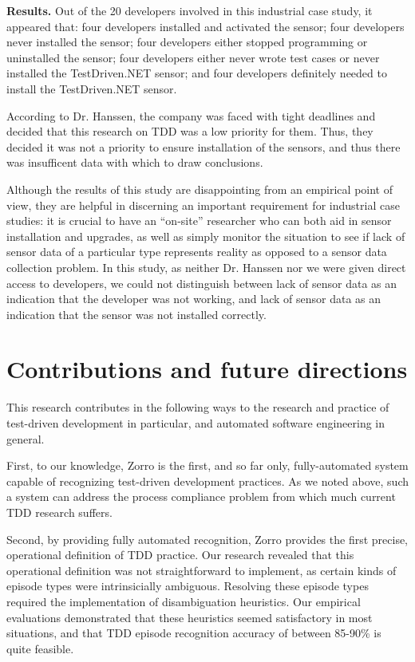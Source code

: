 \documentclass[smallextended]{svjour3}     %
\begin{document}
{\bf Results.}  Out of the 20 developers involved in this industrial case
study, it appeared that: four developers installed and activated the
sensor; four developers never installed the sensor; four developers either
stopped programming or uninstalled the sensor; four developers either never
wrote test cases or never installed the TestDriven.NET sensor; and four
developers definitely needed to install the TestDriven.NET sensor.

According to Dr. Hanssen, the company was faced with tight deadlines and
decided that this research on TDD was a low priority for them.  Thus, they
decided it was not a priority to ensure installation of the sensors, and
thus there was insufficent data with which to draw conclusions. 

Although the results of this study are disappointing from an empirical
point of view, they are helpful in discerning an important requirement for
industrial case studies: it is crucial to have an ``on-site'' researcher
who can both aid in sensor installation and upgrades, as well as simply
monitor the situation to see if lack of sensor data of a particular type
represents reality as opposed to a sensor data collection problem.  In this
study, as neither Dr. Hanssen nor we were given direct access to
developers, we could not distinguish between lack of sensor data as an
indication that the developer was not working, and lack of sensor data as
an indication that the sensor was not installed correctly.

\section{Contributions and future directions}
\label{sec:conclusions}

This research contributes in the following ways to the research and
practice of test-driven development in particular, and automated software
engineering in general.

First, to our knowledge, Zorro is the first, and so far only,
fully-automated system capable of recognizing test-driven development
practices.  As we noted above, such a system can address the 
process compliance problem from which much current TDD research suffers. 

Second, by providing fully automated recognition, Zorro provides the first
precise, operational definition of TDD practice.  Our research revealed
that this operational definition was not straightforward to implement, as
certain kinds of episode types were intrinsicially ambiguous.  Resolving
these episode types required the implementation of disambiguation
heuristics. Our empirical evaluations demonstrated that these heuristics
seemed satisfactory in most situations, and that TDD episode recognition
accuracy of between 85-90\% is quite feasible.
\end{document}
